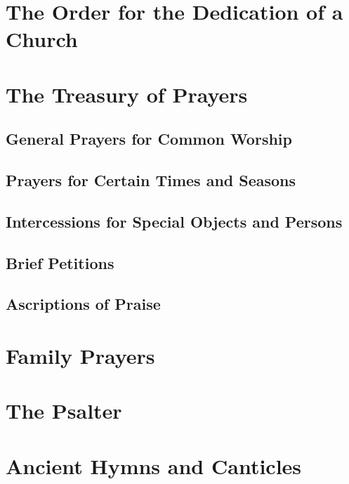 \documentclass[titlepage,a5paper,12pt]{book}
\begin{document}
\chapter[Dedication of a Church]{The Order for the Dedication of a Church}

\chapter{The Treasury of Prayers}
	\section{General Prayers for Common Worship}
	\section{Prayers for Certain Times and Seasons}
	\section{Intercessions for Special Objects and Persons}
	\section{Brief Petitions}
	\section{Ascriptions of Praise}
\chapter{Family Prayers}


\chapter{The Psalter}
\chapter{Ancient Hymns and Canticles}

\end{document}

